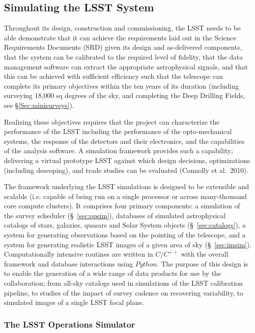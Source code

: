 \documentclass{emulateapj}
\newcommand{\B}[1]{{#1}}
\begin{document}
\B{
\vskip 0.4in
\subsection{Simulating the LSST System}


Throughout its design, construction and commissioning, the LSST needs
to be able demonstrate that it can achieve the requirements laid out
in the Science Requirements Documents (SRD) given its design and
as-delivered components, that the system can be calibrated to the
required level of fidelity, that the data management software can
extract the appropriate astrophysical signals, and that this can be
achieved with sufficient efficiency such that the telescope can
complete its primary objectives within the ten years of its duration
(including surveying 18,000 sq degrees of the sky, and completing the
Deep Drilling Fields, see \S \ref{Sec:minisurveys}). 


Realizing these objectives requires that the project can characterize
the performance of the LSST including the performance of the
opto-mechanical systems, the response of the detectors and their
electronics, and the capabilities of the analysis software. A
simulation framework provides such a capability; delivering a virtual
prototype LSST against which design decisions, optimizations
(including descoping), and trade studies can be evaluated (Connolly
et al.~2010).


The framework underlying the LSST simulations is designed to be
extensible and scalable (i.e. capable of being run on a single
processor or across many-thousand core compute clusters). It comprises
four primary components: a simulation of the survey scheduler
(\S~\ref{sec:opsim}),
databases of simulated astrophysical catalogs of stars, galaxies,
quasars and Solar System objects (\S~\ref{sec:catalogs}), a system for generating observations
based on the pointing of the telescope, and a system for generating
realistic LSST images of a given area of sky
(\S~\ref{sec:imsim}). Computationally intensive routines are written 
in $C/C^{++}$ with the overall framework and database interactions
using $Python$.  The purpose of this design is to enable the
generation of a wide range of data products for use by the
collaboration; from all-sky catalogs used in simulations of the LSST
calibration pipeline, to studies of the impact of survey cadence on
recovering variability, to simulated images of a single LSST focal
plane.


\subsubsection{ The LSST Operations Simulator \label{sec:opsim}}

}
\end{document}
